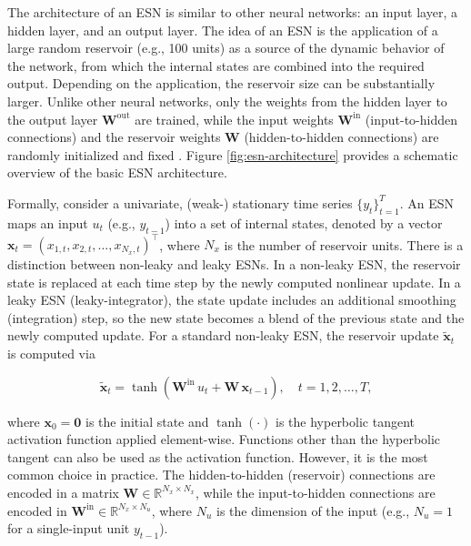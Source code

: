 The architecture of an ESN is similar to other neural networks: an input layer, a hidden layer, and an output layer. The idea of an ESN is the application of a large random reservoir (e.g., 100 units) as a source of the dynamic behavior of the network, from which the internal states are combined into the required output. Depending on the application, the reservoir size can be substantially larger. Unlike other neural networks, only the weights from the hidden layer to the output layer \(\mathbf{W}^\mathrm{out}\) are trained, while the input weights \(\mathbf{W}^\mathrm{in}\) (input-to-hidden connections) and the reservoir weights \(\mathbf{W}\) (hidden-to-hidden connections) are randomly initialized and fixed \citep{Lukosevicius2012}. Figure \ref{fig:esn-architecture} provides a schematic overview of the basic ESN architecture.

Formally, consider a univariate, (weak-) stationary time series \(\{y_t\}_{t=1}^{T}\). An ESN maps an input \(u_t\) (e.g., \(y_{t-1}\)) into a set of internal states, denoted by a vector \(\mathbf{x}_t = (x_{1,t}, x_{2,t}, \ldots, x_{N_x, t})^\top\), where \(N_x\) is the number of reservoir units. There is a distinction between non-leaky and leaky ESNs. In a non-leaky ESN, the reservoir state is replaced at each time step by the newly computed nonlinear update. In a leaky ESN (leaky-integrator), the state update includes an additional smoothing (integration) step, so the new state becomes a blend of the previous state and the newly computed update. For a standard non-leaky ESN, the reservoir update \(\tilde{\mathbf{x}}_t\) is computed via

\begin{equation}
\tilde{\mathbf{x}}_t = \tanh\!\left(\mathbf{W}^{\mathrm{in}}\,u_t + \mathbf{W}\,\mathbf{x}_{t-1}\right), \quad t = 1, 2, \ldots, T,
\label{eq:reservoir}
\end{equation}

where \(\mathbf{x}_0 = \mathbf{0}\) is the initial state and \(\tanh(\cdot)\) is the hyperbolic tangent activation function applied element-wise. Functions other than the hyperbolic tangent can also be used as the activation function. However, it is the most common choice in practice. The hidden-to-hidden (reservoir) connections are encoded in a matrix \(\mathbf{W}\in\mathbb{R}^{N_x \times N_x}\), while the input-to-hidden connections are encoded in \(\mathbf{W}^{\mathrm{in}}\in\mathbb{R}^{N_x \times N_u}\), where \(N_u\) is the dimension of the input (e.g., \(N_u = 1\) for a single-input unit \(y_{t-1}\)).

